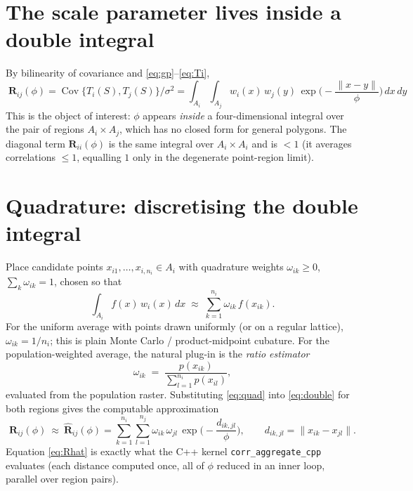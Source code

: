 \documentclass[11pt]{article}
\newcommand{\R}{\mathbf{R}}
\newcommand{\Ai}{A_i}
\newcommand{\Aj}{A_j}
\begin{document}
\section{The scale parameter lives inside a double integral}

By bilinearity of covariance and \eqref{eq:gp}--\eqref{eq:Ti},
\begin{equation}
\boxed{\;
\R_{ij}(\phi)
= \operatorname{Cov}\!\big\{T_i(S),T_j(S)\big\}\big/\sigma^2
= \int_{\Ai}\!\int_{\Aj} w_i(x)\,w_j(y)\,
   \exp\!\Big(-\frac{\|x-y\|}{\phi}\Big)\,dx\,dy \; }
\label{eq:double}
\end{equation}
This is the object of interest: $\phi$ appears \emph{inside} a four-dimensional
integral over the pair of regions $\Ai\times\Aj$, which has no closed form for
general polygons. The diagonal term $\R_{ii}(\phi)$ is the same integral over
$\Ai\times\Ai$ and is $<1$ (it averages correlations $\le 1$, equalling $1$ only in
the degenerate point-region limit).

\section{Quadrature: discretising the double integral}

Place candidate points $x_{i1},\dots,x_{i,n_i}\in\Ai$ with quadrature weights
$\omega_{ik}\ge 0$, $\sum_{k}\omega_{ik}=1$, chosen so that
\begin{equation}
\int_{\Ai} f(x)\,w_i(x)\,dx \;\approx\; \sum_{k=1}^{n_i}\omega_{ik}\,f(x_{ik}).
\label{eq:quad}
\end{equation}
For the uniform average with points drawn uniformly (or on a regular lattice),
$\omega_{ik}=1/n_i$; this is plain Monte Carlo / product-midpoint cubature. For the
population-weighted average, the natural plug-in is the \emph{ratio estimator}
\begin{equation}
\omega_{ik} \;=\; \frac{p(x_{ik})}{\sum_{l=1}^{n_i} p(x_{il})},
\label{eq:popw}
\end{equation}
evaluated from the population raster. Substituting \eqref{eq:quad} into
\eqref{eq:double} for both regions gives the computable approximation
\begin{equation}
\R_{ij}(\phi)\ \approx\ \widehat{\R}_{ij}(\phi)
= \sum_{k=1}^{n_i}\sum_{l=1}^{n_j}
  \omega_{ik}\,\omega_{jl}\,
  \exp\!\Big(-\frac{d_{ik,jl}}{\phi}\Big),
\qquad d_{ik,jl}=\|x_{ik}-x_{jl}\|.
\label{eq:Rhat}
\end{equation}
Equation \eqref{eq:Rhat} is exactly what the C++ kernel
\texttt{corr\_aggregate\_cpp} evaluates (each distance computed once, all of
$\phi$ reduced in an inner loop, parallel over region pairs).
\end{document}
